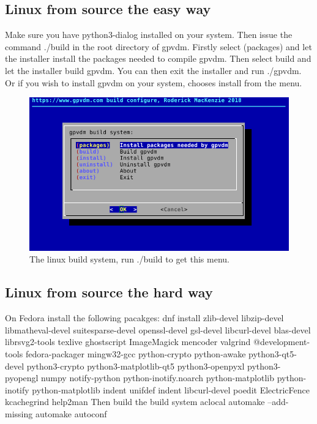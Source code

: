 \documentclass[11pt]{article}
\begin{document}
\subsection{Linux from source the easy way}
Make sure you have python3-dialog installed on your system.  Then issue the command ./build in the root directory of gpvdm.  Firstly select (packages) and let the installer install the packages needed to compile gpvdm.  Then select build and let the installer build gpvdm.  You can then exit the installer and run ./gpvdm.  Or if you wish to install gpvdm on your system, chooses install from the menu.

\begin{figure}[ht!]
\centering
\includegraphics[width=120mm]{./images/build.png}
\caption{The linux build system, run ./build to get this menu.  }
\label{fig:build}
\end{figure}


\subsection{Linux from source the hard way}

On Fedora install the following pacakges:\newline
dnf install zlib-devel libzip-devel libmatheval-devel suitesparse-devel openssl-devel gsl-devel libcurl-devel blas-devel librsvg2-tools texlive ghostscript ImageMagick mencoder valgrind @development-tools fedora-packager mingw32-gcc python-crypto python-awake python3-qt5-devel python3-crypto python3-matplotlib-qt5 python3-openpyxl python3-pyopengl numpy notify-python python-inotify.noarch python-matplotlib python-inotify python-matplotlib indent unifdef indent libcurl-devel poedit ElectricFence kcachegrind help2man\newline
\newline
Then build the build system\newline
aclocal\newline
automake --add-missing\newline
automake\newline
autoconf\newline
\end{document}
